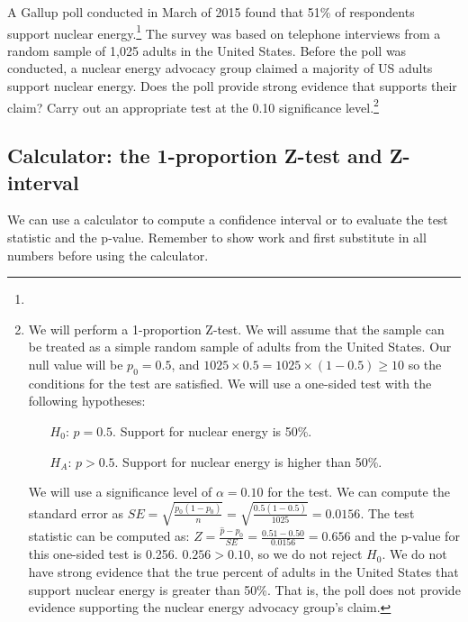 \begin{exercise}
A Gallup poll conducted in March of 2015 found that 51\% of respondents support nuclear energy.\footnote{} The survey was based on telephone interviews from a random sample of 1,025 adults in the United States. Before the poll was conducted, a nuclear energy advocacy group claimed a majority of US adults support nuclear energy. Does the poll provide strong evidence that supports their claim? Carry out an appropriate test at the 0.10 significance level.\footnote{We will perform a 1-proportion Z-test.  We will assume that the sample can be treated as a simple random sample of adults from the United States.  Our null value will be $p_0 = 0.5$, and $1025\times 0.5=1025\times(1-0.5)\ge10$ so the conditions for the test are satisfied. We will use a one-sided test with the following hypotheses:
\begin{itemize}
\item[$H_0$:] $p = 0.5$. Support for nuclear energy is 50\%.
\item[$H_A$:] $p > 0.5$. Support for nuclear energy is higher than 50\%.
\end{itemize}
We will use a significance level of $\alpha = 0.10$ for the test. We can compute the standard error as $SE = \sqrt{\frac{p_0 (1 - p_0)}{n}} = \sqrt{\frac{0.5 (1 - 0.5)}{1025}} = 0.0156$.  The test statistic can be computed as: $Z = \frac{\hat{p} - p_0}{SE} = \frac{0.51 - 0.50}{0.0156} = 0.656$ and the p-value for this one-sided test is 0.256.  $0.256>0.10$, so we do not reject $H_0$.  We do not have strong evidence that the true percent of adults in the United States that support nuclear energy is greater than 50\%. That is, the poll does not provide evidence supporting the nuclear energy advocacy group's claim.}
\end{exercise}


\subsection{Calculator: the 1-proportion Z-test and Z-interval}

We can use a calculator to compute a confidence interval or to evaluate the test statistic and the p-value. Remember to show work and first substitute in all numbers before using the calculator.


